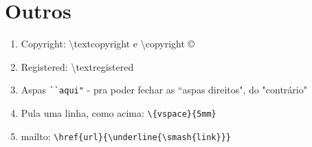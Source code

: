 \documentclass[a4paper, 12pt]{article}
\begin{document}
\lipsum[1]

\section{Outros}

\begin{enumerate}[label=(\arabic*), left=15mm..22mm]
	\item Copyright: \textbackslash{textcopyright} \textcopyright \space e \textbackslash{copyright} \copyright
	\item Registered: \textbackslash{textregistered} \textregistered
	\item Aspas \verb|``aqui"| - pra poder fechar as ``aspas direitos", do "contrário"
	\item Pula uma linha, como acima: \verb|\{vspace}{5mm}|
	\item mailto: \verb|\href{url}{\underline{\smash{link}}}|
\end{enumerate}
\end{document}
